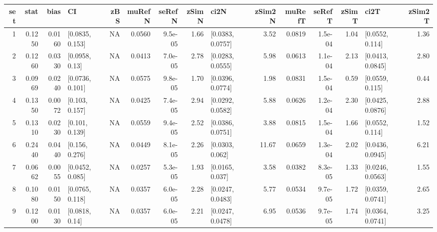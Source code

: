 
\begin{tabular}{r|r|r|l|r|r|r|r|l|r|r|r|r|l|r}
\hline
set & stat & bias & CI & zBS & muRefN & seRefN & zSimN & ci2N & zSim2N & muRefT & seRefT & zSimT & ci2T & zSim2T\\
\hline
1 & 0.1250 & 0.0160 & [0.0835, 0.153] & NA & 0.0560 & 9.5e-05 & 1.66 & [0.0383, 0.0757] & 3.52 & 0.0819 & 1.5e-04 & 1.04 & [0.0552, 0.114] & 1.36\\
\hline
2 & 0.1260 & 0.0330 & [0.0958, 0.13] & NA & 0.0413 & 7.0e-05 & 2.78 & [0.0283, 0.0555] & 5.98 & 0.0613 & 1.1e-04 & 2.13 & [0.0413, 0.0845] & 2.80\\
\hline
3 & 0.0969 & 0.0240 & [0.0736, 0.101] & NA & 0.0575 & 9.8e-05 & 1.70 & [0.0396, 0.0774] & 1.98 & 0.0831 & 1.5e-04 & 0.59 & [0.0559, 0.115] & 0.44\\
\hline
4 & 0.1350 & 0.0072 & [0.103, 0.157] & NA & 0.0425 & 7.4e-05 & 2.94 & [0.0292, 0.0582] & 5.88 & 0.0626 & 1.2e-04 & 2.30 & [0.0425, 0.0876] & 2.88\\
\hline
5 & 0.1310 & 0.0230 & [0.101, 0.139] & NA & 0.0559 & 9.4e-05 & 2.52 & [0.0386, 0.0751] & 3.88 & 0.0815 & 1.5e-04 & 1.66 & [0.0552, 0.114] & 1.52\\
\hline
6 & 0.2440 & 0.0440 & [0.156, 0.276] & NA & 0.0449 & 8.1e-05 & 2.26 & [0.0303, 0.062] & 11.67 & 0.0659 & 1.3e-04 & 2.02 & [0.0436, 0.0945] & 6.21\\
\hline
7 & 0.0662 & 0.0055 & [0.0452, 0.085] & NA & 0.0257 & 5.3e-05 & 1.93 & [0.0165, 0.037] & 3.58 & 0.0382 & 8.3e-05 & 1.33 & [0.0246, 0.0563] & 1.55\\
\hline
8 & 0.1080 & 0.0150 & [0.0765, 0.118] & NA & 0.0357 & 6.0e-05 & 2.28 & [0.0247, 0.0483] & 5.77 & 0.0534 & 9.7e-05 & 1.72 & [0.0359, 0.0741] & 2.65\\
\hline
9 & 0.1200 & 0.0130 & [0.0818, 0.14] & NA & 0.0357 & 6.0e-05 & 2.21 & [0.0247, 0.0478] & 6.95 & 0.0536 & 9.7e-05 & 1.74 & [0.0364, 0.0741] & 3.25\\
\hline
\end{tabular}

